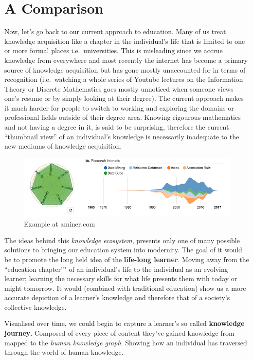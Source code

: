 \documentclass[]{book}
\theoremstyle{definition}
\theoremstyle{definition}
\theoremstyle{definition}
\theoremstyle{remark}
\begin{document}
\section{A Comparison}\label{a-comparison}

Now, let's go back to our current approach to education. Many of us
treat knowledge acquisition like a chapter in the individual's life that
is limited to one or more formal places i.e.~universities. This is
misleading since we accrue knowledge from everywhere and most recently
the internet has become a primary source of knowledge acquisition but
has gone mostly unaccounted for in terms of recognition (i.e.~watching a
whole series of Youtube lectures on the Information Theory or Discrete
Mathematics goes mostly unnoticed when someone views one's resume or by
simply looking at their degree). The current approach makes it much
harder for people to switch to working and exploring the domains or
professional fields outside of their degree area. Knowing rigourous
mathematics and not having a degree in it, is said to be surprising,
therefore the current ``thumbnail view'' of an individual's knowledge is
necessarily inadequate to the new mediums of knowledge acquisition.

\begin{figure}
\centering
\includegraphics{img/aminer.png}
\caption{Example at aminer.com}
\end{figure}

The ideas behind this \emph{knowledge ecosystem}, presents only one of
many possible solutions to bringing our education system into modernity.
The goal of it would be to promote the long held idea of the
\textbf{life-long learner}. Moving away from the ``education chapter''"
of an individual's life to the individual as an evolving learner;
learning the necessary skills for what life presents them with today or
might tomorrow. It would (combined with traditional education) show us a
more accurate depiction of a learner's knowledge and therefore that of a
society's collective knowledge.

Visualised over time, we could begin to capture a learner's so called
\textbf{knowledge journey}. Composed of every piece of content they've
gained knowledge from mapped to the \emph{human knowledge graph}.
Showing how an individual has traversed through the world of human
knowledge.
\end{document}
